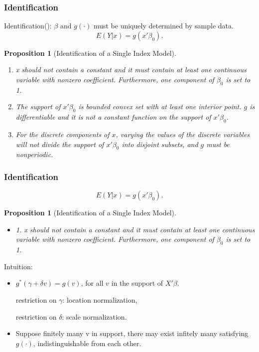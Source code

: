 \documentclass{beamer}
\begin{document}
\begin{frame}[t]
    \frametitle{Identification}
	  Identification(\cite{[13]}): $\beta$ and $ g(\cdot)$ must be uniquely determined by sample data.
     \begin{equation}
		E(Y|x) = g(x'\beta_0).
	  \end{equation}
    \newtheorem{prop1}{Proposition}[section]   
	  \begin{prop1}[Identification of a Single Index Model] 
		
		\begin{enumerate}
        \item  x should not contain a constant and it must contain at least one continuous variable with nonzero coefficient. Furthermore, one component of $\beta_0$ is set to 1.
        \item  The support of $x'\beta_0$ is bounded convex set with at least one interior point. $g$ is differentiable and it is not a constant function on the support of $x'\beta_0$.
        \item  For the discrete components of $x$, varying the values of the discrete variables will not divide the support of $x'\beta_0$ into disjoint subsets, and $g$ must be nonperiodic.		
		\end{enumerate}
    
    \end{prop1}

\note{~}
\end{frame}


\begin{frame}[t]
    \frametitle{Identification}
     \begin{equation*}
		E(Y|x) = g(x'\beta_0).
	  \end{equation*}
    \newtheorem{prop2}{Proposition}[section]   
	  \begin{prop2}[Identification of a Single Index Model] 
		\begin{itemize}
		  \item 1. x should not contain a constant and it must contain at least one continuous variable with nonzero coefficient. Furthermore, one component of $\beta_0$ is set to 1.
		\end{itemize}
    \end{prop2}
    Intuition:
    \begin{itemize}
      
      \item $g^{*}(\gamma + \delta v) = g(v)$, for all $v$ in the support of $X'\beta$.
      
      	 restriction on $\gamma$: location normalization,
      	 
      	 restriction on $\delta$: scale normalization.
      \item Suppose finitely many v in support, there may exist infitely many satisfying $g(\cdot)$, indistinguishable from each other.
      
    \end{itemize}
    

\note{~}
\end{frame}
\end{document}
